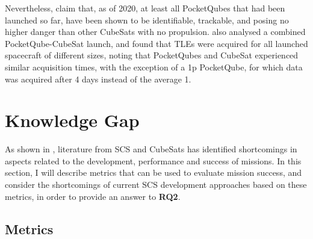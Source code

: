 \documentclass[a4paper,nobib,justified,final]{tufte-book}
\begin{document}
Nevertheless, \autocite{FCCBigProblem2018,albaorbitalTrackingPocketQubes2020} claim that, as of 2020, at least all PocketQubes that had been launched so far, have been shown to be identifiable, trackable, and posing no higher danger than other CubeSats with no propulsion. \autocite{sperettaCubeSatsPocketQubesOpportunities2016} also analysed a combined PocketQube-CubeSat launch, and found that \acsp{TLE} were acquired for all launched spacecraft of different sizes, noting that PocketQubes and CubeSat experienced similar acquisition times, with the exception of a 1p PocketQube, for which data was acquired after 4 days instead of the average 1.

\FloatBarrier

\section{Knowledge Gap}
\label{sec:LITERATURE_gap}

As shown in , literature from \acs{SCS} and CubeSats has identified shortcomings in aspects related to the development, performance and success of missions. In this section, I will describe metrics that can be used to evaluate mission success, and consider the shortcomings of current \acs{SCS} development approaches based on these metrics, in order to provide an answer to \textbf{\acs{RQ}2}.



\subsection{Metrics}
\label{sec:LITERATURE_metrics}
\end{document}
